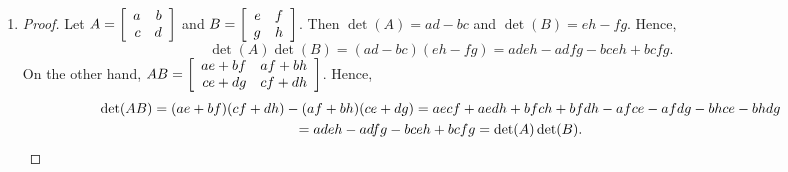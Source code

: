 
\begin{enumerate}[!HW!, start=1]
\itemspade Yes, it is consistent for any $\bb b$. $A\bb x=\bb b$ has no free variables. $A\bb x=\bb b$ has a unique solution.
\itemspade $I_5$
\itemspade $\ker(T)=\{\bb 0\}$, $\im(T) = \R^5$. Yes, $T$ is both one-to-one and onto.
\item \begin{proof} %
Let $A = \mtx{rr}{a&b\\c&d}$  and $B = \mtx{rr}{e&f\\g&h}$. Then $\det(A) = ad-bc$ and $\det(B)=eh-fg$. Hence,
\[\det(A)\det(B) = (ad-bc)(eh-fg) = adeh  - adfg-bceh+bcfg.\] On the other hand, $AB=\mtx{rr}{ae+bf&af+bh\\ ce+dg&cf+dh}$. Hence, \begin{multline*}\det(AB) = (ae+bf)(cf+dh)-(af+bh)(ce+dg) = aecf+aedh+bfch+bfdh-afce-afdg-bhce-bhdg\\ = adeh  - adfg-bceh+bcfg = \det(A)\det(B).\qedhere \end{multline*}
\end{proof}
\end{enumerate}

\vspace{-15 pt}